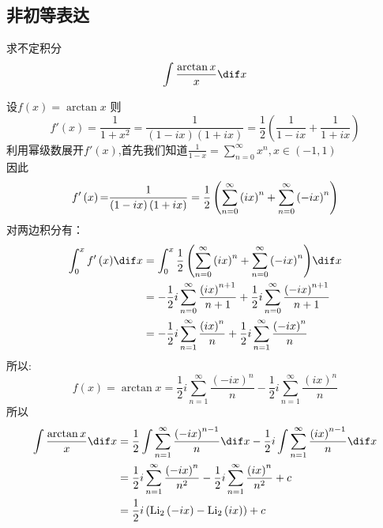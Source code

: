\documentclass[color=green,titlestyle=hang]{elegantbook}%
\begin{document}
\subsection{非初等表达}

\begin{exercise}求不定积分\[\int\frac{\arctan x}{x} \dif x\]
\end{exercise}\begin{Solution}设$\displaystyle f\left( x \right) = \arctan x$
则\[ f'\left( x \right) = \frac{1}{{1 + {x^2}}} = \frac{1}{{\left( {1 - ix} \right)\left( {1 + ix} \right)}} = \frac{1}{2}\left( {\frac{1}{{1 - ix}} + \frac{1}{{1 + ix}}} \right)\]
利用幂级数展开$\displaystyle f'(x)$,首先我们知道$\displaystyle \frac{1}{{1 - x}} = \sum\limits_{n = 0}^\infty  {{x^n}} ,x \in ( - 1,1)$\\
因此\[ f'\left( x \right){\rm{ = }}\frac{1}{{\left( {1 - ix} \right)\left( {1 + ix} \right)}} = \frac{1}{2}\left( {\sum\limits_{n = 0}^\infty  {{{\left( {ix} \right)}^n}}  + \sum\limits_{n = 0}^\infty  {{{\left( { - ix} \right)}^n}} } \right)\]
对两边积分有：\begin{align*}
\int_0^x {f'\left( x \right)} \dif x &= \int_0^x {\frac{1}{2}\left( {\sum\limits_{n = 0}^\infty  {{{\left( {ix} \right)}^n}}  + \sum\limits_{n = 0}^\infty  {{{\left( { - ix} \right)}^n}} } \right)} \dif x\\
&=  - \frac{1}{2}i\sum\limits_{n = 0}^\infty  {\frac{{{{\left( {ix} \right)}^{n + 1}}}}{{n + 1}}}  + \frac{1}{2}i\sum\limits_{n = 0}^\infty  {\frac{{{{\left( { - ix} \right)}^{n + 1}}}}{{n + 1}}} \\
&=  - \frac{1}{2}i\sum\limits_{n = 1}^\infty  {\frac{{{{\left( {ix} \right)}^n}}}{n}}  + \frac{1}{2}i\sum\limits_{n = 1}^\infty  {\frac{{{{\left( { - ix} \right)}^n}}}{n}}
\end{align*}
所以:\[ f\left( x \right) = \arctan x = \frac{1}{2}i\sum\limits_{n = 1}^\infty  {\frac{{{{\left( { - ix} \right)}^n}}}{n}}  - \frac{1}{2}i\sum\limits_{n = 1}^\infty  {\frac{{{{\left( {ix} \right)}^n}}}{n}} \]
所以\begin{align*}
\int {\frac{{\arctan x}}{x}} \dif x &= \frac{1}{2}\int {\sum\limits_{n = 1}^\infty  {\frac{{{{\left( { - ix} \right)}^{n - 1}}}}{n}} } \dif x - \frac{1}{2}i\int {\sum\limits_{n = 1}^\infty  {\frac{{{{\left( {ix} \right)}^{n - 1}}}}{n}} } \dif x\\
&= \frac{1}{2}i\sum\limits_{n = 1}^\infty  {\frac{{{{\left( { - ix} \right)}^n}}}{{{n^2}}}}  - \frac{1}{2}i\sum\limits_{n = 1}^\infty  {\frac{{{{\left( {ix} \right)}^n}}}{{{n^2}}}}  + c\\
&= \frac{1}{2}i\left({\textrm{Li}_2\left( { - ix} \right) - {\textrm{Li}_2}\left( {ix} \right)} \right) + c
\end{align*}
\end{Solution}
\end{document}
